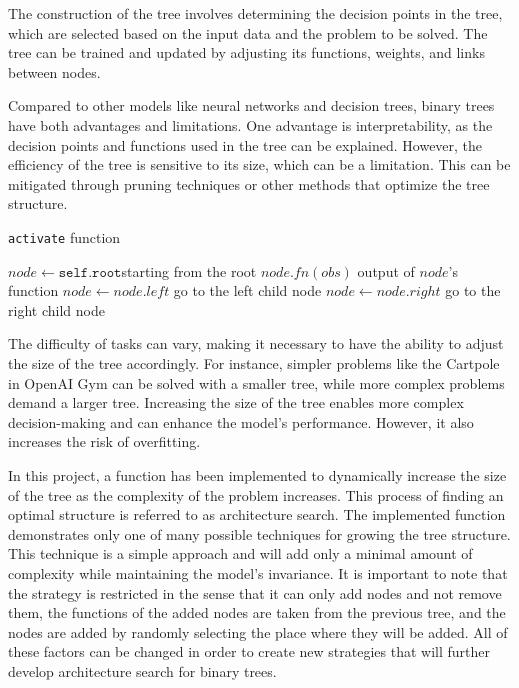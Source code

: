 The construction of the tree involves determining the decision points in the tree, which are selected based on the input data and the problem to be solved. The tree can be trained and updated by adjusting its functions, weights, and links between nodes.

Compared to other models like neural networks and decision trees, binary trees have both advantages and limitations. One advantage is interpretability, as the decision points and functions used in the tree can be explained. However, the efficiency of the tree is sensitive to its size, which can be a limitation. This can be mitigated through pruning techniques or other methods that optimize the tree structure.

\begin{algorithm}
\caption{\texttt{activate} function}
\label{algo:pseudo_activate_function}
\begin{algorithmic}[1]
\State $node \gets \texttt{self.root}$\Comment starting from the root 
    \Return $node.fn(obs)$ \Comment output of $node$'s function
    \State $node \gets node.left$ \Comment go to the left child node
\Else 
    \State $node \gets node.right$ \Comment go to the right child node
\EndIf
\EndWhile
\EndFunction
\end{algorithmic}
\end{algorithm}

The difficulty of tasks can vary, making it necessary to have the ability to adjust the size of the tree accordingly. For instance, simpler problems like the Cartpole in OpenAI Gym can be solved with a smaller tree, while more complex problems demand a larger tree. Increasing the size of the tree enables more complex decision-making and can enhance the model's performance. However, it also increases the risk of overfitting.

In this project, a function has been implemented to dynamically increase the size of the tree as the complexity of the problem increases. This process of finding an optimal structure is referred to as architecture search. The implemented function demonstrates only one of many possible techniques for growing the tree structure. This technique is a simple approach and will add only a minimal amount of complexity while maintaining the model's invariance. It is important to note that the strategy is restricted in the sense that it can only add nodes and not remove them, the functions of the added nodes are taken from the previous tree, and the nodes are added by randomly selecting the place where they will be added. All of these factors can be changed in order to create new strategies that will further develop architecture search for binary trees.

